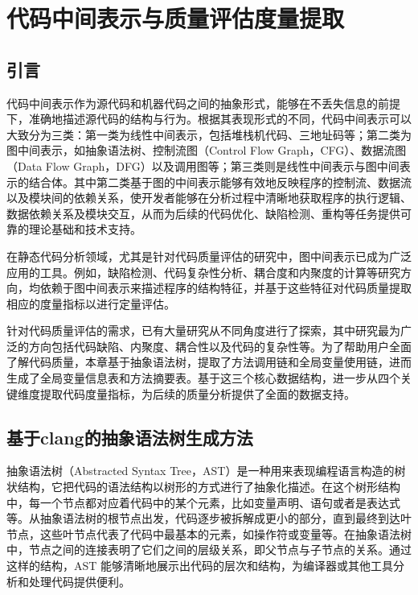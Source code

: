 
\chapter{代码中间表示与质量评估度量提取}

\section{引言}

代码中间表示作为源代码和机器代码之间的抽象形式，能够在不丢失信息的前提下，准确地描述源代码的结构与行为。根据其表现形式的不同，代码中间表示可以大致分为三类\cite{2020MLIR}：第一类为线性中间表示，包括堆栈机代码、三地址码等；第二类为图中间表示，如抽象语法树、控制流图（Control Flow Graph，CFG）、数据流图（Data Flow Graph，DFG）以及调用图等；第三类则是线性中间表示与图中间表示的结合体。其中第二类基于图的中间表示能够有效地反映程序的控制流、数据流以及模块间的依赖关系，使开发者能够在分析过程中清晰地获取程序的执行逻辑、数据依赖关系及模块交互，从而为后续的代码优化、缺陷检测、重构等任务提供可靠的理论基础和技术支持。

在静态代码分析领域，尤其是针对代码质量评估的研究中，图中间表示已成为广泛应用的工具。例如，缺陷检测、代码复杂性分析、耦合度和内聚度的计算等研究方向，均依赖于图中间表示来描述程序的结构特征，并基于这些特征对代码质量提取相应的度量指标以进行定量评估。

针对代码质量评估的需求，已有大量研究从不同角度进行了探索，其中研究最为广泛的方向包括代码缺陷、内聚度、耦合性以及代码的复杂性等。为了帮助用户全面了解代码质量，本章基于抽象语法树，提取了方法调用链和全局变量使用链，进而生成了全局变量信息表和方法摘要表。基于这三个核心数据结构，进一步从四个关键维度提取代码度量指标，为后续的质量分析提供了全面的数据支持。



\section{基于clang的抽象语法树生成方法}
抽象语法树（Abstracted Syntax Tree，AST）是一种用来表现编程语言构造的树状结构，它把代码的语法结构以树形的方式进行了抽象化描述。在这个树形结构中，每一个节点都对应着代码中的某个元素，比如变量声明、语句或者是表达式等。从抽象语法树的根节点出发，代码逐步被拆解成更小的部分，直到最终到达叶节点，这些叶节点代表了代码中最基本的元素，如操作符或变量等。在抽象语法树中，节点之间的连接表明了它们之间的层级关系，即父节点与子节点的关系。通过这样的结构，AST 能够清晰地展示出代码的层次和结构，为编译器或其他工具分析和处理代码提供便利。


